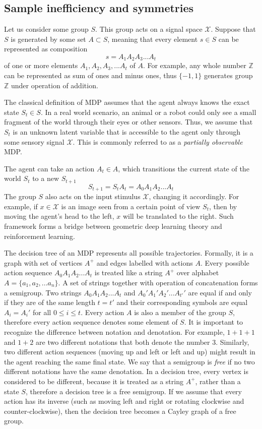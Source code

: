 \documentclass[12pt]{article}
\begin{document}
\subsection{Sample inefficiency and symmetries}

Let us consider some group $S$. This group acts on a signal space $\mathcal{X}$. Suppose that $S$ is generated by some set $A \subset S$, meaning that every element $s\in S$ can be represented as composition 
\[
s = A_1 A_2 A_3 ... A_t
\]
of one or more elements $A_1,A_2,A_3,...A_t$ of $A$. For example, any whole number $\mathbb{Z}$ can be represented as sum of ones and minus ones, thus $\{-1,1\}$ generates group $\mathbb{Z}$ under operation of addition. 

The classical definition of MDP assumes that the agent always knows the exact state $S_t \in S$. In a real world scenario, an animal or a robot could only see a small fragment of the world through their eyes or other sensors. Thus, we assume that $S_t$ is an unknown latent variable that is accessible to the agent only through some sensory signal $\mathcal{X}$. This is commonly referred to as a \textit{partially observable} MDP. 

The agent can take an action $A_t\in A$, which transitions the current state of the world $S_t$ to a new $S_{t+1}$
\[
S_{t+1} = S_{t}A_t = A_0 A_1 A_2 ... A_t
\]
The group $S$ also acts on the input stimulus $\mathcal{X}$, changing it accordingly. For example, if $x\in\mathcal{X}$ is an image seen from a certain point of view $S_t$, then by moving the agent's head to the left, $x$ will be translated to the right.  Such framework forms a bridge between geometric deep learning theory and reinforcement learning.

The decision tree of an MDP represents all possible trajectories. Formally, it is a graph with set of vertices $A^+$ and edges labelled with actions $A$. Every possible action sequence $A_0A_1A_2...A_t$ is treated like a string $A^+$ over alphabet $A=\{a_1,a_2,...a_n\}$. A set of strings together with operation of concatenation forms a semigroup. Two strings $A_0A_1A_2...A_t$ and $A_0'A_1'A_2'...A_{t'}'$ are equal if and only if they are of the same length $t=t'$ and their corresponding symbols are equal $A_i=A_i'$ for all $0\le i \le t$. Every action $A$ is also a member of the group $S$, therefore every action sequence denotes some element of $S$. It is important to recognize the difference between notation and denotation. For example, $1+1+1$ and $1+2$ are two different notations that both denote the number $3$. Similarly, two different action sequences (moving up and left or left and up) might result in the agent reaching the same final state. 
We say that a semigroup is \textit{free} if no two different notations have the same denotation. In a decision tree, every vertex is considered to be different, because it is treated as a string $A^+$, rather than a state $S$, therefore a decision tree is a free semigroup. If we assume that every action has its inverse (such as moving left and right or rotating clockwise and counter-clockwise), then the decision tree becomes a Cayley graph of a free group.
\end{document}
